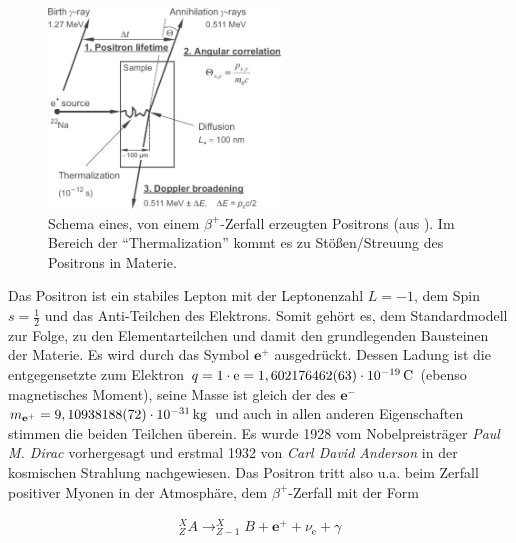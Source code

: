 \documentclass[numbers=noenddot,a4paper]{scrartcl}
\newcommand{\tenpo}[1]{ 10^{#1}}
\newcommand{\ix}[1]{_\text{#1}}
\newcommand{\tilt}[1]{\textit{#1}}
\begin{document}
			\begin{figure}
				\includegraphics[width=0.55\textwidth,height=0.5\textwidth]{zerfallsschema.png}
				\caption{Schema eines, von einem $\beta^+$-Zerfall erzeugten Positrons (aus \cite{Augsten08}). Im Bereich der "`Thermalization"' kommt es zu Stößen/Streuung des Positrons in Materie.}
				\label{img:zerfall}
			\end{figure}
	
			Das Positron ist ein stabiles Lepton mit der Leptonenzahl $L=-1$, dem Spin $s=\frac{1}{2}$ und das Anti-Teilchen des Elektrons. Somit gehört es, dem Standardmodell zur Folge, zu den Elementarteilchen und damit den grundlegenden Bausteinen der Materie. Es wird durch das Symbol $\textbf{e}^+$ ausgedrückt. Dessen Ladung ist die entgegensetzte zum Elektron $q=1\cdot\text{e}=\unit[1,602 176462(63)\cdot\tenpo{-19}]{C}$ (ebenso magnetisches Moment), seine Masse ist gleich der des $\textbf{e}^-$ $m_{\textbf{e}^+}=\unit[9,10938188(72)\cdot\tenpo{-31}]{kg}$ und auch in allen anderen Eigenschaften stimmen die beiden Teilchen überein. Es wurde 1928 vom Nobelpreisträger \tilt{Paul M. Dirac} vorhergesagt und erstmal 1932 von \tilt{Carl David Anderson} in der kosmischen Strahlung nachgewiesen. Das Positron tritt also u.a. beim Zerfall positiver Myonen in der Atmosphäre, dem $\beta^+$-Zerfall mit der Form
			
			\begin{align}
				^{X}_{Z}A \rightarrow ^{X}_{Z-1}B+\textbf{e}^{+}+\nu\ix{e}+\gamma
			\end{align}
	
\end{document}
